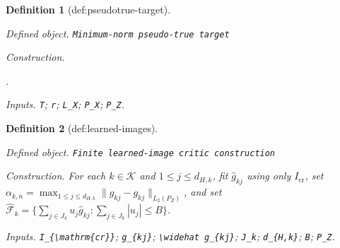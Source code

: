 \documentclass{article}
\newtheorem{definition}{Definition}
\begin{document}
\begin{definition}[def:pseudotrue-target]\label{def:pseudotrue-target}
\par\smallskip\noindent\emph{Defined object.} \texttt{Minimum-\allowbreak{}norm pseudo-\allowbreak{}true target}
\par\smallskip\noindent\emph{Construction.} \par\noindent {}\par\noindent.
\par\smallskip\noindent\emph{Inputs.} \texttt{T}; \texttt{r}; \texttt{L\_\allowbreak{}X}; \texttt{P\_\allowbreak{}X}; \texttt{P\_\allowbreak{}Z}.
\end{definition}

\begin{definition}[def:learned-images]\label{def:learned-images}
\par\smallskip\noindent\emph{Defined object.} \texttt{Finite learned-\allowbreak{}image critic construction}
\par\smallskip\noindent\emph{Construction.} For each \(k\in\mathcal K\) and \(1\le j\le d_{H,k}\), fit \(\widehat g_{kj}\) using only \(I_{\mathrm{cr}}\), set \(\alpha_{k,n}=\max_{1\le j\le d_{H,k}}\|\widehat g_{kj}-g_{kj}\|_{L_2(P_Z)}\), and set \(\widehat{\mathcal F}_k=\{\sum_{j\in J_k}u_j\widehat g_{kj}:\sum_{j\in J_k}|u_j|\le B\}\).
\par\smallskip\noindent\emph{Inputs.} \texttt{I\_\allowbreak{}\{\textbackslash{}\allowbreak{}mathrm\{cr\}\allowbreak{}\}\allowbreak{}}; \texttt{g\_\allowbreak{}\{kj\}\allowbreak{}}; \texttt{\textbackslash{}\allowbreak{}widehat g\_\allowbreak{}\{kj\}\allowbreak{}}; \texttt{J\_\allowbreak{}k}; \texttt{d\_\allowbreak{}\{H,\allowbreak{}k\}\allowbreak{}}; \texttt{B}; \texttt{P\_\allowbreak{}Z}.
\end{definition}
\end{document}
